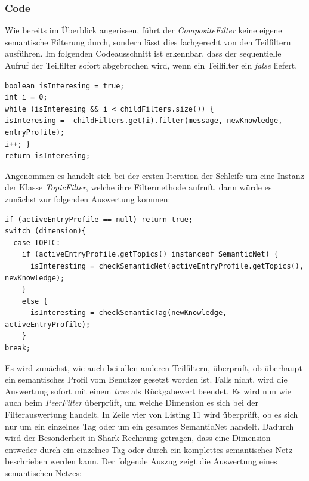 \subsubsection{Code}
Wie bereits im Überblick angerissen, führt der \textit{CompositeFilter} keine eigene semantische Filterung durch, sondern lässt dies fachgerecht von den Teilfiltern ausführen. Im folgenden Codeausschnitt ist erkennbar, dass der sequentielle Aufruf der Teilfilter sofort abgebrochen wird, wenn ein Teilfilter ein \textit{false} liefert.\newline
\lstset{language=Java, caption=Filtermethode im Kompositum, label=DescriptiveLabel, numbers=left, numbersep=1em, breaklines=true, basicstyle=\small}
\begin{lstlisting}
boolean isInteresing = true;
int i = 0;
while (isInteresing && i < childFilters.size()) {
isInteresing =  childFilters.get(i).filter(message, newKnowledge, entryProfile);
i++; }
return isInteresing;
\end{lstlisting}
Angenommen es handelt sich bei der ersten Iteration der Schleife um eine Instanz der Klasse \textit{TopicFilter}, welche ihre Filtermethode aufruft, dann würde es zunächst zur folgenden Auswertung kommen:\newpage
\lstset{language=Java, caption=Filtermethode des TopicType Filters (Auszug), label=DescriptiveLabel, numbers=left, numbersep=1em, breaklines=true, basicstyle=\small}
\begin{lstlisting}
if (activeEntryProfile == null) return true;
switch (dimension){
  case TOPIC:
    if (activeEntryProfile.getTopics() instanceof SemanticNet) {
	  isInteresting = checkSemanticNet(activeEntryProfile.getTopics(), newKnowledge);
	}
	else {
	  isInteresting = checkSemanticTag(newKnowledge, activeEntryProfile);
    }
break;
\end{lstlisting}
Es wird zunächst, wie auch bei allen anderen Teilfiltern, überprüft, ob überhaupt ein semantisches Profil vom Benutzer gesetzt worden ist. Falls nicht, wird die Auswertung sofort mit einem \textit{true} als Rückgabewert beendet. Es wird nun wie auch beim \textit{PeerFilter} überprüft, um welche Dimension es sich bei der Filterauswertung handelt. In Zeile vier von Listing 11 wird überprüft, ob es sich nur um ein einzelnes Tag oder um ein gesamtes SemanticNet handelt. Dadurch wird der Besonderheit in Shark Rechnung getragen, dass eine Dimension entweder durch ein einzelnes Tag oder durch ein komplettes semantisches Netz beschrieben werden kann. Der folgende Auszug zeigt die Auswertung eines semantischen Netzes:\newline
